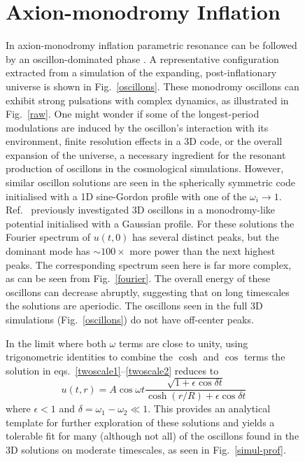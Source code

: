 \documentclass[%
reprint,
superscriptaddress,
amsmath,amssymb,
aps,
prd,
floatfix,
nofootinbib
]{revtex4-1}
\begin{document}
\begin{figure}

\section{Axion-monodromy Inflation}

In  axion-monodromy inflation  \cite{Silverstein:2008sg,McAllister:2008hb,Flauger:2009ab} parametric resonance can be followed by an oscillon-dominated phase  \cite{Amin:2011hj,Zhou:2013tsa}. A  representative configuration  extracted from a simulation of the expanding, post-inflationary universe \cite{Easther:2010qz} is shown in Fig.~\ref{oscillons}. These monodromy oscillons can exhibit strong pulsations with  complex dynamics, as illustrated in Fig.~\ref{raw}.  One might wonder if some of the longest-period modulations are induced by the oscillon's interaction with its environment,  finite resolution effects in a 3D code, or the overall expansion of the universe, a necessary  ingredient for the resonant production of oscillons in the cosmological simulations. However, similar oscillon solutions are seen in the spherically symmetric code initialised with a 1D sine-Gordon profile with one of the $\omega_i\to1$. Ref.~\cite{Salmi:2012ta} previously investigated 3D oscillons in a monodromy-like potential initialised with a Gaussian profile. For these solutions the Fourier spectrum of $u(t,0)$ has several distinct peaks, but the dominant mode has $\sim 100\times$ more power than the next highest peaks. The corresponding spectrum seen here is far more complex,  as can be seen from  Fig.~\ref{fourier}. The overall energy of these oscillons can decrease abruptly, suggesting that on long timescales the solutions are aperiodic. The oscillons seen in the full 3D simulations (Fig.~\ref{oscillons}) do not have off-center peaks.  

In the limit where  both $\omega$ terms are  close to unity, using trigonometric identities to combine the $\cosh$ and $\cos$ terms the solution in eqs.~\ref{twoscale1}--\ref{twoscale2} reduces to
%
\begin{equation} \label{fitprof}
  u(t,r) = A\cos\omega t \frac{\sqrt{1+\epsilon \cos \delta t}}{\cosh(r/R) + \epsilon \cos \delta t}
\end{equation}
where $\epsilon<1$ and $\delta = \omega_1-\omega_2 \ll 1$. This provides an analytical template for further exploration of these solutions and yields a tolerable fit for many (although not all) of the oscillons found in the 3D solutions on moderate timescales, as seen in Fig.~\ref{simul-prof}. 


\end{figure}
\end{document}
